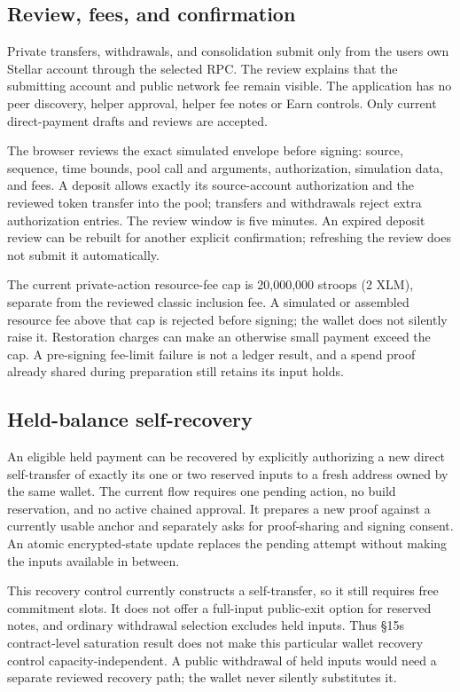 \documentclass[11pt,letterpaper]{article}
\begin{document}
\subsection{Review, fees, and
confirmation}\label{review-fees-and-confirmation}

Private transfers, withdrawals, and consolidation submit only from the
user\textquotesingle s own Stellar account through the selected RPC. The
review explains that the submitting account and public network fee
remain visible. The application has no peer discovery, helper approval,
helper fee notes or Earn controls. Only current direct-payment drafts
and reviews are accepted.

The browser reviews the exact simulated envelope before signing: source,
sequence, time bounds, pool call and arguments, authorization,
simulation data, and fees. A deposit allows exactly its source-account
authorization and the reviewed token transfer into the pool; transfers
and withdrawals reject extra authorization entries. The review window is
five minutes. An expired deposit review can be rebuilt for another
explicit confirmation; refreshing the review does not submit it
automatically.

The current private-action resource-fee cap is 20,000,000 stroops (2
XLM), separate from the reviewed classic inclusion fee. A simulated or
assembled resource fee above that cap is rejected before signing; the
wallet does not silently raise it. Restoration charges can make an
otherwise small payment exceed the cap. A pre-signing fee-limit failure
is not a ledger result, and a spend proof already shared during
preparation still retains its input holds.

\subsection{Held-balance
self-recovery}\label{held-balance-self-recovery}

An eligible held payment can be recovered by explicitly authorizing a
new direct self-transfer of exactly its one or two reserved inputs to a
fresh address owned by the same wallet. The current flow requires one
pending action, no build reservation, and no active chained approval. It
prepares a new proof against a currently usable anchor and separately
asks for proof-sharing and signing consent. An atomic encrypted-state
update replaces the pending attempt without making the inputs available
in between.

This recovery control currently constructs a self-transfer, so it still
requires free commitment slots. It does not offer a full-input
public-exit option for reserved notes, and ordinary withdrawal selection
excludes held inputs. Thus \S{}15\textquotesingle s contract-level
saturation result does not make this particular wallet recovery control
capacity-independent. A public withdrawal of held inputs would need a
separate reviewed recovery path; the wallet never silently substitutes
it.
\end{document}
